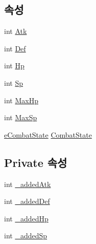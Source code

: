 \subsection*{속성}
\begin{DoxyCompactItemize}
\item 
int \hyperlink{class_combat_added_deco_aeb5992435525404a992ee9f028a2cf0d}{Atk}
\item 
int \hyperlink{class_combat_added_deco_ac3d7d042df2e8c8cbec3d6cbcb85ae96}{Def}
\item 
int \hyperlink{class_combat_added_deco_a6810b0a4d852d7f8dc61145e2c7c9fc4}{Hp}
\item 
int \hyperlink{class_combat_added_deco_aac41784d0f685c5db6107affca78d089}{Sp}
\item 
int \hyperlink{class_combat_added_deco_a6e24be83c5d6b04b0d900103bb398d2e}{Max\+Hp}
\item 
int \hyperlink{class_combat_added_deco_aa1dde14484472ac5d8b42d3ee9b745f2}{Max\+Sp}
\item 
\hyperlink{_unit_object_8cs_ae6d9f4a8ae9fffcdf1a546168a44f917}{e\+Combat\+State} \hyperlink{class_combat_added_deco_a16e7a3ae7dc8751d25ef0b6ee0ce5531}{Combat\+State}
\end{DoxyCompactItemize}
\subsection*{Private 속성}
\begin{DoxyCompactItemize}
\item 
int \hyperlink{class_combat_added_deco_ae3e4d0cbbf900b51cadf756154b9cd80}{\+\_\+added\+Atk}
\item 
int \hyperlink{class_combat_added_deco_abb40c78d41f1f133a285415b70506940}{\+\_\+added\+Def}
\item 
int \hyperlink{class_combat_added_deco_aa6d7287956c39e242ed254faf29e6a3b}{\+\_\+added\+Hp}
\item 
int \hyperlink{class_combat_added_deco_a02d5c40dcf180b1ad7086856dfa83929}{\+\_\+added\+Sp}
\end{DoxyCompactItemize}


